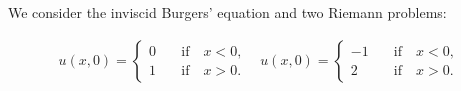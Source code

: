 We consider the inviscid Burgers' equation and two Riemann problems:
\noindent\begin{minipage}{\linewidth}
\begin{subequations}
\begin{align} \label{eq:RP-R1}
u(x,0) = \left\{ \begin{array}{ll}
         0 \quad & \text{if} \quad x < 0, \\
         1	     & \text{if} \quad x > 0. \end{array} \right.
\end{align}
\begin{align} \label{eq:RP-R2}
u(x,0) = \left\{ \begin{array}{ll}
         -1 \quad & \text{if} \quad x < 0, \\
         2	      & \text{if} \quad x > 0. \end{array} \right.
\end{align}
\end{subequations}
\phantom \\
\end{minipage}

